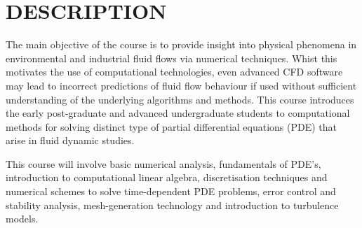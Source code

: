 \documentclass[12pts,a4paper,amsmath,amssymb,floatfix]{article}%
\begin{document}
\section{DESCRIPTION}
 The main objective of the course is to provide insight into physical phenomena in environmental and industrial fluid flows via numerical techniques. Whist this motivates the use of computational technologies, even advanced CFD software may lead to incorrect predictions of fluid flow behaviour if used without sufficient understanding of the underlying algorithms and methods. This course introduces the early post-graduate and advanced undergraduate students to computational methods for solving distinct type of partial differential equations (PDE) that arise in fluid dynamic studies.

This course will involve basic numerical analysis, fundamentals of PDE's, introduction to computational linear algebra, discretisation techniques and numerical schemes to solve time-dependent PDE problems, error control and stability analysis, mesh-generation technology and introduction to turbulence models.

\end{document}
